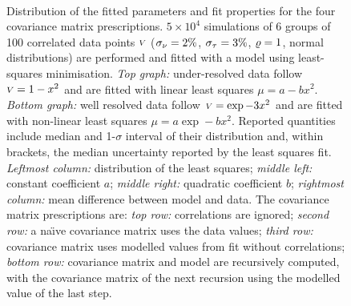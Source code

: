 \documentclass{pasa}
\begin{document}
\begin{figure}
\centering
{}\\
\caption{Distribution of the fitted parameters and fit properties for the four covariance matrix prescriptions. $5\times10^4$ simulations of 6 groups of 100 correlated data points ${\scriptstyle V}$ ($\sigma_\nu = 2\%$, $\sigma_\tau = 3\%$, $\varrho = 1$, normal distributions) are performed and fitted with a model using least-squares minimisation. \emph{Top graph:} under-resolved data follow ${\scriptstyle V} = 1-x^2$ and are fitted with linear least squares $\mu = a - bx^2$. \emph{Bottom graph:} well resolved data follow ${\scriptstyle V} = \exp -3x^2$ and are fitted with non-linear least squares $\mu = a\exp -bx^2$. Reported quantities include median and 1-$\sigma$ interval of their distribution and, within brackets, the median uncertainty reported by the least squares fit. \emph{Leftmost column:} distribution of the least squares; \emph{middle left:} constant coefficient $a$; \emph{middle right:} quadratic coefficient $b$; \emph{rightmost column:} mean difference between model and data. The covariance matrix prescriptions are: \emph{top row:} correlations are ignored; \emph{second row:} a na\"\i{}ve covariance matrix uses the data values; \emph{third row:} covariance matrix uses modelled values from fit without correlations; \emph{bottom row:} covariance matrix and model are recursively computed, with the covariance matrix of the next recursion using the modelled value of the last step. }
\end{figure}
\end{document}
